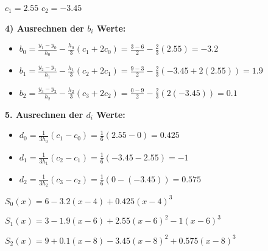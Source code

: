 \documentclass{article}
\begin{document}
\(c_1 = 2.55\) \(c_2 = -3.45\)

\textbf{4) Ausrechnen der \(b_i\) Werte:}
\begin{itemize}
    \item \(b_0 = \frac{y_1-y_0}{h_0}-\frac{h_0}{3}(c_1+2c_0) = \frac{3-6}{2}-\frac{2}{3}(2.55) = -3.2\)
    \item \(b_1 = \frac{y_2-y_1}{h_1}-\frac{h_1}{3}(c_2+2c_1) = \frac{9-3}{2}-\frac{2}{3}(-3.45+2(2.55)) = 1.9\)
    \item \(b_2 = \frac{y_3-y_2}{h_2}-\frac{h_2}{3}(c_3+2c_2) = 
    \frac{0-9}{2}-\frac{2}{3}(2(-3.45)) = 0.1\)
\end{itemize}

\textbf{5. Ausrechnen der \(d_i\) Werte:}
\begin{itemize}
    \item \(d_0 = \frac{1}{3h_0}(c_1-c_0) = \frac{1}{6}(2.55-0) = 0.425\)
    \item \(d_1 = \frac{1}{3h_1}(c_2-c_1) = \frac{1}{6}(-3.45-2.55) = -1\)
    \item \(d_2 = \frac{1}{3h_2}(c_3-c_2) = \frac{1}{6}(0-(-3.45)) = 0.575\)
\end{itemize}

\hspace{5mm}

\(S_0(x) = 6 - 3.2(x-4) + 0.425(x-4)^3\)

\(S_1(x) = 3 - 1.9(x-6) + 2.55(x-6)^2 - 1(x-6)^3\)

\(S_2(x) = 9 + 0.1(x-8) -3.45(x-8)^2 + 0.575(x-8)^3\)
\end{document}
